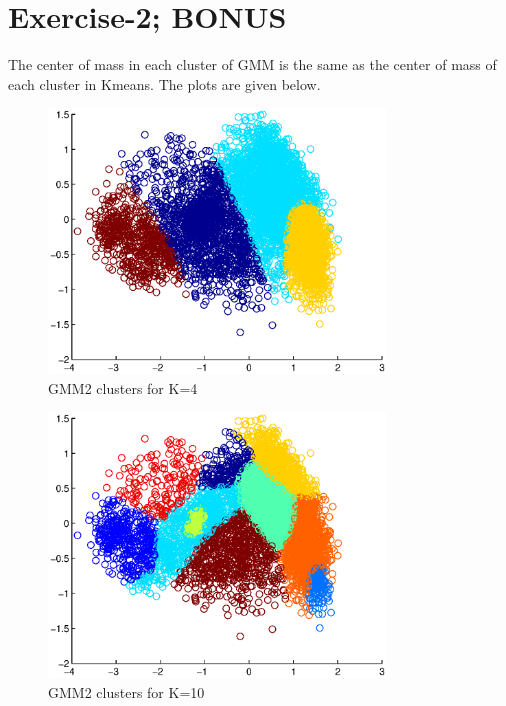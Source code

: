 \documentclass[a4paper]{article}
\begin{document}
\section*{Exercise-2; BONUS}
The center of mass in each cluster of GMM is the same as the center of mass of each cluster in Kmeans. \newline
The plots are given below.
		\begin{figure}[H]
			\begin{center}
				\includegraphics[width=0.8\textwidth]{GMM_KMEANS_K4.eps}
				\caption{GMM2 clusters for K=4}\label{fig:gmm_kmeans_k4}
			\end{center}
		\end{figure}
		
		\begin{figure}[H]
			\begin{center}
				\includegraphics[width=0.8\textwidth]{GMM_KMEANS_K10.eps}
				\caption{GMM2 clusters for K=10}\label{fig:gmm_kmeans_k10}
			\end{center}
		\end{figure}
\end{document}
